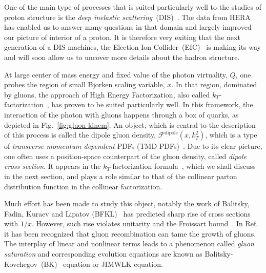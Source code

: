 \documentclass[11pt]{article}
\newcommand{\fdp}[0]{\mathcal{F}^{\mathrm{dipole}}}
\begin{document}
One of the main type of processes that is suited particularly well to the
studies of proton structure is the {\it deep inelastic
scattering}~(DIS)~\cite{Roberts:1990ww,Collins:2011zzd}. The data from HERA has
enabled us to answer many questions in that domain and largely improved our
picture of interior of a proton.  It is therefore very exiting that the next
generation of a DIS machines, the Election Ion Collider~(EIC)~\cite{NAP25171} is
making its way and will soon allow us to uncover more details about the hadron
structure.

At large center of mass energy and fixed value of the photon virtuality, $Q$,
one probes  the region of small Bjorken scaling variable, $x$.  In that region,
dominated by gluons\cite{Roberts:1990ww,Collins:2011zzd, Kovchegov:2012mbw}, the
approach of High Energy Factorization, also called
$k_T$-factorization~\cite{Catani:1990xk,Catani:1990eg,Collins:1991ty,Catani:1993ww,Catani:1993rn,Catani:1994sq},
has proven to be suited particularly well.  In this framework, the interaction
of the photon with gluons happens through a box of quarks, as depicted in
Fig.~\ref{fig:gluon-kinem}. An object, which is central to the description of
this process is called the dipole gluon density, $\fdp(x,k_T^2)$, which is a
type of {\it transverse momentum dependent} PDFs (TMD
PDFs)~\cite{Bomhof:2006dp,Dominguez:2010xd,Dominguez:2011wm,Xiao:2017yya}. 
%
Due to its clear picture, one often uses a position-space counterpart of the gluon density, called {\it dipole cross section}. 
%
It appears in the $k_T$-factorization
formula~\cite{Catani:1990eg,Dominguez:2010xd,Dominguez:2011wm,Xiao:2017yya},
which we shall discuss in the next section, and plays a role similar to that of
the collinear parton distribution function in the collinear factorization.  

Much effort has been made to study this object, notably the work of Balitsky,
Fadin, Kuraev and Lipatov (BFKL)~\cite{Balitsky:1978ic, Kuraev:1977fs} has
predicted sharp rise of cross sections with $1/x$.  However, such rise violates
unitarity and the Froissart
bound~\cite{Roberts:1990ww,Collins:2011zzd,Kovchegov:2012mbw,Barone:1993sy}. In
Ref.~\cite{Gribov:1983ivg} it has been recognized that gluon recombination can
tame the growth of gluons. The interplay of linear and
nonlinear terms leads to a phenomenon called {\it gluon saturation} and
corresponding evolution equations are known as
Balitsky-Kovchegov~(BK)~\cite{Balitsky:1995ub,Kovchegov:1999yj} equation or
JIMWLK\cite{Kovner:1999bj,Kovner:2000pt,Iancu:2000hn,JalilianMarian:1997dw,JalilianMarian:1997gr,JalilianMarian:1997jx}
equation.
\end{document}
